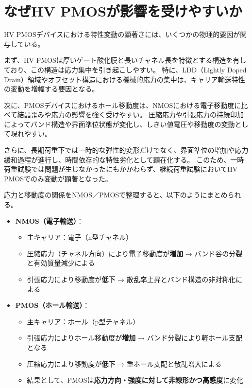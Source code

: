 \documentclass[conference]{IEEEtran}
\begin{document}
\section{なぜHV PMOSが影響を受けやすいか}
HV PMOSデバイスにおける特性変動の顕著さには、いくつかの物理的要因が関与している。  

まず、HV PMOSは厚いゲート酸化膜と長いチャネル長を特徴とする構造を有しており、この構造は応力集中を引き起こしやすい。  
特に、LDD（Lightly Doped Drain）領域やオフセット構造における機械的応力の集中は、キャリア輸送特性の変動を増幅する要因となる。  

次に、PMOSデバイスにおけるホール移動度は、NMOSにおける電子移動度に比べて結晶歪みや応力の影響を強く受けやすい。  
圧縮応力や引張応力の持続印加によってバンド構造や界面準位状態が変化し、しきい値電圧や移動度の変動として現れやすい。  

さらに、長期荷重下では一時的な弾性的変形だけでなく、界面準位の増加や応力緩和過程が進行し、時間依存的な特性劣化として顕在化する。  
このため、一時荷重試験では問題が生じなかったにもかかわらず、継続荷重試験においてHV PMOSでのみ変動が顕著となった。  

\vspace{3mm}
\noindent
応力と移動度の関係をNMOS／PMOSで整理すると、以下のようにまとめられる。

\begin{itemize}
  \item \textbf{NMOS（電子輸送）}：
  \begin{itemize}
    \item 主キャリア：電子（n型チャネル）
    \item 圧縮応力（チャネル方向）により電子移動度が\textbf{増加}  
          → バンド谷の分裂と有効質量減少による
    \item 引張応力により移動度が\textbf{低下}  
          → 散乱率上昇とバンド構造の非対称化による
  \end{itemize}
  \item \textbf{PMOS（ホール輸送）}：
  \begin{itemize}
    \item 主キャリア：ホール（p型チャネル）
    \item 引張応力によりホール移動度が\textbf{増加}  
          → バンド分裂により軽ホール支配となる
    \item 圧縮応力により移動度が\textbf{低下}  
          → 重ホール支配と散乱増大による
    \item 結果として、PMOSは\textbf{応力方向・強度に対して非線形かつ高感度}に変化
  \end{itemize}
\end{itemize}
\end{document}
